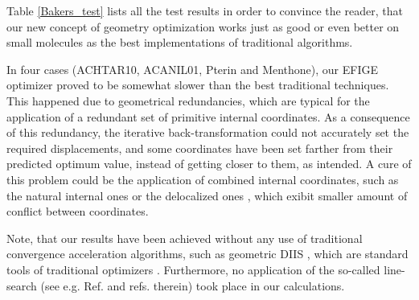 \documentclass[prl,twocolumn,showpacs,twocolumngrid,superbib]{revtex4}
\begin{document}
Table \ref{Bakers_test} lists all the test results
in order to convince
the reader, that our new concept of geometry optimization
works just as good or even better on small molecules 
as the best implementations
of traditional algorithms.

In four cases (ACHTAR10, ACANIL01, Pterin and Menthone), our 
EFIGE optimizer proved to be somewhat slower than the best traditional
techniques. This happened due to geometrical redundancies, which are
typical for the application of a redundant set of primitive internal
coordinates. As a consequence of this redundancy, the iterative
back-transformation could not accurately set the required displacements,
and some coordinates have been set farther from their predicted optimum 
value, instead of getting closer to them, as intended.
A cure of this problem could be the application of 
combined internal coordinates, such as the natural internal ones 
\cite{Pulay_natural_internals} or the 
delocalized ones \cite{Baker_deloc_1}, which exibit
smaller amount of conflict between coordinates. 

Note, that our results have been achieved without any use
of traditional convergence acceleration algorithms, such as 
geometric DIIS \cite{Pulay_GDIIS}, which are standard tools of
traditional optimizers \cite{Farkas_GDIIS}. Furthermore, 
no application of the so-called line-search (see e.g. Ref. \cite{bakken}
and refs. therein) took place in our calculations.
\end{document}
